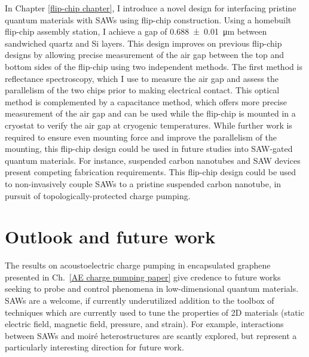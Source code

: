 \documentclass{beavtex_dub_edit}
\begin{document}
In Chapter \ref{flip-chip chapter}, I introduce a novel design for interfacing pristine quantum materials with SAWs using flip-chip construction. Using a homebuilt flip-chip assembly station, I achieve a gap of \SI{0.688(10)}{\micro\meter} between sandwiched quartz and Si layers. This design improves on previous flip-chip designs by allowing precise measurement of the air gap between the top and bottom sides of the flip-chip using two independent methods. The first method is reflectance spectroscopy, which I use to measure the air gap and assess the parallelism of the two chips prior to making electrical contact. This optical method is complemented by a capacitance method, which offers more precise measurement of the air gap and can be used while the flip-chip is mounted in a cryostat to verify the air gap at cryogenic temperatures. While further work is required to ensure even mounting force and improve the parallelism of the mounting, this flip-chip design could be used in future studies into SAW-gated quantum materials. For instance, suspended carbon nanotubes and SAW devices present competing fabrication requirements. This flip-chip design could be used to non-invasively couple SAWs to a pristine suspended carbon nanotube, in pursuit of topologically-protected charge pumping.


%


\section{Outlook and future work} \label{outlook and future work}
The results on acoustoelectric charge pumping in encapsulated graphene presented in Ch.\ \ref{AE charge pumping paper} give credence to future works seeking to probe and control phenomena in low-dimensional quantum materials. SAWs are a welcome, if currently underutilized addition to the toolbox of techniques which are currently used to tune the properties of 2D materials (static electric field, magnetic field, pressure, and strain). For example, interactions between SAWs and moiré heterostructures are scantly explored, but represent a particularly interesting direction for future work. 
\end{document}
